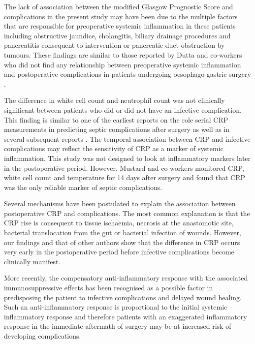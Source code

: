 The lack of association between the modified Glasgow Prognostic Score and complications in the present study may have been due to the multiple factors that are responsible for preoperative systemic inflammation in these patients including obstructive jaundice, cholangitis, biliary drainage procedures and pancreatitis consequent to intervention or pancreatic duct obstruction by tumours. 
These findings are similar to those reported by Dutta and co-workers who did not find any relationship between preoperative systemic inflammation and postoperative complications in patients undergoing oesophago-gastric surgery \parencite{dutta_persistent_2011}.

The difference in white cell count and neutrophil count was not clinically significant between patients who did or did not have an infective complication. 
This finding is similar to one of the earliest reports on the role serial CRP measurements in predicting septic complications after surgery \parencite{mustard_c-reactive_1987} as well as in several subsequent reports \parencite{matthiessen_increase_2008, welsch_persisting_2008, dutta_persistent_2011}. 
The temporal association between CRP and infective complications may reflect the sensitivity of CRP as a marker of systemic inflammation. 
This study was not designed to look at inflammatory markers later in the postoperative period. 
However, Mustard and co-workers monitored CRP, white cell count and temperature for 14 days after surgery and found that CRP was the only reliable marker of septic complications.

Several mechanisms have been postulated to explain the association between postoperative CRP and complications. 
The most common explanation is that the CRP rise is consequent to tissue ischaemia, necrosis at the anastomotic site, bacterial translocation from the gut or bacterial infection of wounds. 
However, our findings and that of other authors show that the difference in CRP occurs very early in the postoperative period before infective complications become clinically manifest. 

More recently, the compensatory anti-inflammatory response with the associated immunosuppressive effects has been recognised as a possible factor in predisposing the patient to infective complications and delayed wound healing. 
Such an anti-inflammatory response is proportional to the initial systemic inflammatory response and therefore patients with an exaggerated inflammatory response in the immediate aftermath of surgery may be at increased risk of developing complications. 

